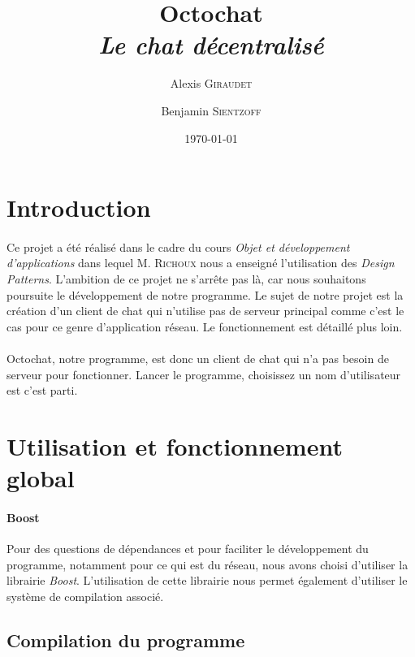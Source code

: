 \documentclass[a4paper]{article}
\title{Octochat \\ \textit{Le chat décentralisé}}
\author{Alexis \textsc{Giraudet} \and Benjamin \textsc{Sientzoff}}
\date{\today}
\begin{document}
	\maketitle
	\vspace{5cm}
	\tableofcontents
	\newpage %
	
	\section*{Introduction}
		\paragraph{}{
		Ce projet a été réalisé dans le cadre du cours \textit{Objet et développement d'applications}
		dans lequel M. \textsc{Richoux} nous a enseigné l'utilisation des \textit{Design Patterns}.
		L'ambition de ce projet ne s'arrête pas là, car nous souhaitons poursuite le développement de notre 
		programme. Le sujet de notre projet est la création d'un client de chat qui n'utilise pas de serveur
		principal comme c'est le cas pour ce genre d'application réseau. Le fonctionnement est détaillé plus loin.
		}
		\paragraph{}{
		Octochat, notre programme, est donc un client de chat qui n'a pas besoin de serveur pour fonctionner.
		Lancer le programme, choisissez un nom d'utilisateur est c'est parti.
		}
	
	\newpage
	
	\section{Utilisation et fonctionnement global}
	
		\paragraph{Boost}{
		Pour des questions de dépendances et pour faciliter le développement du programme, notamment pour ce qui est du réseau,
		nous avons choisi d'utiliser la librairie \textit{Boost}.
		L’utilisation de cette librairie nous permet également d'utiliser le système de compilation associé.
		}
	
		\subsection{Compilation du programme}
\end{document}
